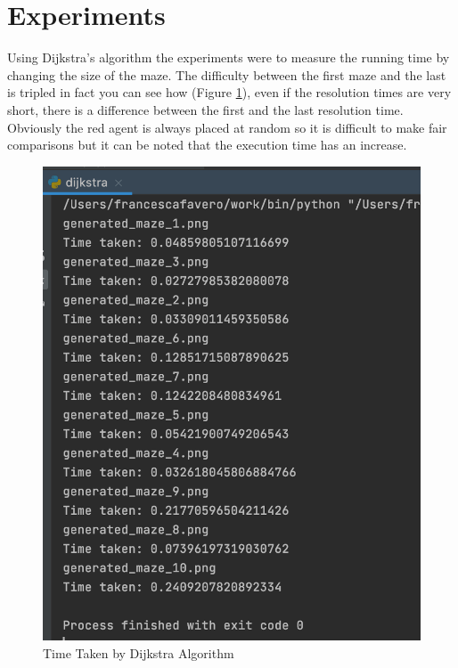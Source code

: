 \section{Experiments}
Using Dijkstra's algorithm the experiments were to measure the running time by changing the size of the maze. The difficulty between the first maze and the last is tripled in fact you can see how (Figure \ref{fig:timedijkstra}), even if the resolution times are very short, there is a difference between the first and the last resolution time. Obviously the red agent is always placed at random so it is difficult to make fair comparisons but it can be noted that the execution time has an increase.

\begin{figure}
\centering
\includegraphics[width=0.7\linewidth]{img/timeDijkstra}
\caption{Time Taken by Dijkstra Algorithm}
\label{fig:timedijkstra}
\end{figure}

